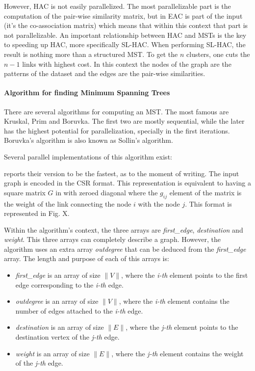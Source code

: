 However, HAC is not easily parallelized. The most parallelizable part is the computation of the pair-wise similarity matrix, but in EAC is part of the input (it's the co-association matrix) which means that within this context that part is not parallelizable.
An important relationship between HAC and MSTs is the key to speeding up HAC, more specifically SL-HAC.
When performing SL-HAC, the result is nothing more than a structured MST. To get the $n$ clusters, one cuts the $n-1$ links with highest cost. In this context the nodes of the graph are the patterns of the dataset and the edges are the pair-wise similarities.

\paragraph{Algorithm for finding Minimum Spanning Trees}
There are several algorithms for computing an MST. The most famous are Kruskal, Prim and Boruvka. The first two are mostly sequential, while the later has the highest potential for parallelization, specially in the first iterations.
Boruvka's algorithm is also known as Sollin's algorithm.

Several parallel implementations of this algorithm exist:


\cite{Sousa2015} reports their version to be the fastest, as to the moment of writing. The input graph is encoded in the CSR format. This representation is equivalent to having a square matrix $G$ in with zeroed diagonal where the $g_{ij}$ element of the matrix is the weight of the link connecting the node $i$ with the node $j$. This format is represented in Fig. X. %

Within the algorithm's context, the three arrays are \emph{first\_edge}, \emph{destination} and \emph{weight}. This three arrays can completely describe a graph. However, the algorithm uses an extra array \emph{outdegree} that can be deduced from the \emph{first\_edge} array. The length and purpose of each of this arrays is:
\begin{itemize}
	\item \emph{first\_edge} is an array of size $\|V\|$, where the \emph{i-th} element points to the first edge corresponding to the \emph{i-th} edge.
	\item \emph{outdegree} is an array of size $\|V\|$, where the \emph{i-th} element contains the number of edges attached to the \emph{i-th} edge.
	\item \emph{destination} is an array of size $\|E\|$, where the \emph{j-th} element points to the destination vertex of the \emph{j-th} edge.
	\item \emph{weight} is an array of size $\|E\|$, where the \emph{j-th} element contains the weight of the \emph{j-th} edge.
\end{itemize}

